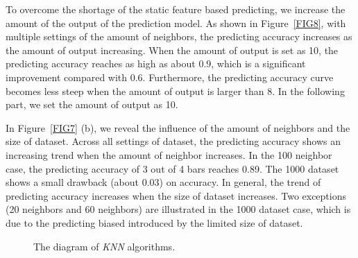 \documentclass[bst/sn-mathphys]{sn-jnl}%
\theoremstyle{thmstyleone}%
\theoremstyle{thmstyletwo}%
\theoremstyle{thmstylethree}%
\begin{document}
To overcome the shortage of the static feature based predicting, we increase 
the amount of the output of the prediction model. As shown in 
Figure~\ref{FIG8}, with multiple settings of the amount of neighbors, the 
predicting accuracy increases as the amount of output increasing. When the 
amount of output is set as 10, the predicting accuracy reaches as high as 
about 0.9, which is a significant improvement compared with 0.6. Furthermore, 
the predicting accuracy curve becomes less steep when the amount of output is 
larger than 8. In the following part, we set the amount of output as 10.

In Figure~\ref{FIG7} (b), we reveal the influence of the amount of neighbors and 
the size of dataset. Across all settings of dataset, the predicting accuracy 
shows an increasing trend when the amount of neighbor increases. In the 100 
neighbor case, the predicting accuracy of 3 out of 4 bars reaches 0.89. The 
1000 dataset shows a small drawback (about 0.03) on accuracy. In general, the 
trend of predicting accuracy increases when the size of dataset increases. Two 
exceptions (20 neighbors and 60 neighbors) are illustrated in the 1000 dataset 
case, which is due to the predicting biased introduced by the limited size of 
dataset.


\begin{figure}[h]%
\centering
{}
\caption{The diagram of \emph{KNN} algorithms.}\label{FIG5}
\end{figure}
\end{document}
